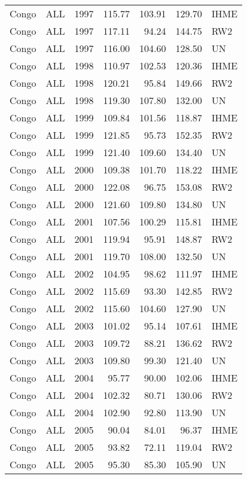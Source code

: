 \begin{longtable}{lllrrrl}
  Congo & ALL & 1997 & 115.77 & 103.91 & 129.70 & IHME \\ 
  Congo & ALL & 1997 & 117.11 & 94.24 & 144.75 & RW2 \\ 
  Congo & ALL & 1997 & 116.00 & 104.60 & 128.50 & UN \\ 
  Congo & ALL & 1998 & 110.97 & 102.53 & 120.36 & IHME \\ 
  Congo & ALL & 1998 & 120.21 & 95.84 & 149.66 & RW2 \\ 
  Congo & ALL & 1998 & 119.30 & 107.80 & 132.00 & UN \\ 
  Congo & ALL & 1999 & 109.84 & 101.56 & 118.87 & IHME \\ 
  Congo & ALL & 1999 & 121.85 & 95.73 & 152.35 & RW2 \\ 
  Congo & ALL & 1999 & 121.40 & 109.60 & 134.40 & UN \\ 
  Congo & ALL & 2000 & 109.38 & 101.70 & 118.22 & IHME \\ 
  Congo & ALL & 2000 & 122.08 & 96.75 & 153.08 & RW2 \\ 
  Congo & ALL & 2000 & 121.60 & 109.80 & 134.80 & UN \\ 
  Congo & ALL & 2001 & 107.56 & 100.29 & 115.81 & IHME \\ 
  Congo & ALL & 2001 & 119.94 & 95.91 & 148.87 & RW2 \\ 
  Congo & ALL & 2001 & 119.70 & 108.00 & 132.50 & UN \\ 
  Congo & ALL & 2002 & 104.95 & 98.62 & 111.97 & IHME \\ 
  Congo & ALL & 2002 & 115.69 & 93.30 & 142.85 & RW2 \\ 
  Congo & ALL & 2002 & 115.60 & 104.60 & 127.90 & UN \\ 
  Congo & ALL & 2003 & 101.02 & 95.14 & 107.61 & IHME \\ 
  Congo & ALL & 2003 & 109.72 & 88.21 & 136.62 & RW2 \\ 
  Congo & ALL & 2003 & 109.80 & 99.30 & 121.40 & UN \\ 
  Congo & ALL & 2004 & 95.77 & 90.00 & 102.06 & IHME \\ 
  Congo & ALL & 2004 & 102.32 & 80.71 & 130.06 & RW2 \\ 
  Congo & ALL & 2004 & 102.90 & 92.80 & 113.90 & UN \\ 
  Congo & ALL & 2005 & 90.04 & 84.01 & 96.37 & IHME \\ 
  Congo & ALL & 2005 & 93.82 & 72.11 & 119.04 & RW2 \\ 
  Congo & ALL & 2005 & 95.30 & 85.30 & 105.90 & UN \\ 

\end{longtable}
